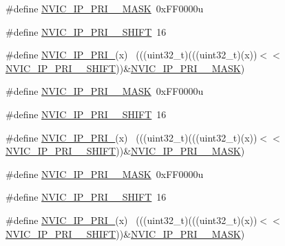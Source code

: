 \begin{DoxyCompactItemize}
\item 
\#define \hyperlink{group___n_v_i_c___register___masks_ga020ccac56651e055f659cbcc0387d0b2}{N\+V\+I\+C\+\_\+\+I\+P\+\_\+\+P\+R\+I\+\_\+\_\+\+M\+A\+SK}~0x\+F\+F0000u
\item 
\#define \hyperlink{group___n_v_i_c___register___masks_ga9ecbd3ab4a0623c8001df6917c2764b2}{N\+V\+I\+C\+\_\+\+I\+P\+\_\+\+P\+R\+I\+\_\+\_\+\+S\+H\+I\+FT}~16
\item 
\#define \hyperlink{group___n_v_i_c___register___masks_ga2ee87e9760b319a619478b44d48a0781}{N\+V\+I\+C\+\_\+\+I\+P\+\_\+\+P\+R\+I\+\_}(x)                                              ~(((uint32\+\_\+t)(((uint32\+\_\+t)(x))$<$$<$\hyperlink{group___n_v_i_c___register___masks_ga9ecbd3ab4a0623c8001df6917c2764b2}{N\+V\+I\+C\+\_\+\+I\+P\+\_\+\+P\+R\+I\+\_\+\_\+\+S\+H\+I\+FT}))\&\hyperlink{group___n_v_i_c___register___masks_ga020ccac56651e055f659cbcc0387d0b2}{N\+V\+I\+C\+\_\+\+I\+P\+\_\+\+P\+R\+I\+\_\+\_\+\+M\+A\+SK})
\item 
\#define \hyperlink{group___n_v_i_c___register___masks_gab53749f36c450457fd446a1711f69c13}{N\+V\+I\+C\+\_\+\+I\+P\+\_\+\+P\+R\+I\+\_\+\_\+\+M\+A\+SK}~0x\+F\+F0000u
\item 
\#define \hyperlink{group___n_v_i_c___register___masks_ga40e00b75ebe69a73a1ee9a41ef0c3d9b}{N\+V\+I\+C\+\_\+\+I\+P\+\_\+\+P\+R\+I\+\_\+\_\+\+S\+H\+I\+FT}~16
\item 
\#define \hyperlink{group___n_v_i_c___register___masks_ga550661c149fe417e7d4e2e488552bd59}{N\+V\+I\+C\+\_\+\+I\+P\+\_\+\+P\+R\+I\+\_}(x)                                            ~(((uint32\+\_\+t)(((uint32\+\_\+t)(x))$<$$<$\hyperlink{group___n_v_i_c___register___masks_ga40e00b75ebe69a73a1ee9a41ef0c3d9b}{N\+V\+I\+C\+\_\+\+I\+P\+\_\+\+P\+R\+I\+\_\+\_\+\+S\+H\+I\+FT}))\&\hyperlink{group___n_v_i_c___register___masks_gab53749f36c450457fd446a1711f69c13}{N\+V\+I\+C\+\_\+\+I\+P\+\_\+\+P\+R\+I\+\_\+\_\+\+M\+A\+SK})
\item 
\#define \hyperlink{group___n_v_i_c___register___masks_ga99c3d327033fb0d1f9bdbef784ebe3ed}{N\+V\+I\+C\+\_\+\+I\+P\+\_\+\+P\+R\+I\+\_\+\_\+\+M\+A\+SK}~0x\+F\+F0000u
\item 
\#define \hyperlink{group___n_v_i_c___register___masks_gaa24809c00c9d32beee7171f4a75221e8}{N\+V\+I\+C\+\_\+\+I\+P\+\_\+\+P\+R\+I\+\_\+\_\+\+S\+H\+I\+FT}~16
\item 
\#define \hyperlink{group___n_v_i_c___register___masks_gaf8701f5319b3a4dafebcc9b6a733e558}{N\+V\+I\+C\+\_\+\+I\+P\+\_\+\+P\+R\+I\+\_}(x)                                            ~(((uint32\+\_\+t)(((uint32\+\_\+t)(x))$<$$<$\hyperlink{group___n_v_i_c___register___masks_gaa24809c00c9d32beee7171f4a75221e8}{N\+V\+I\+C\+\_\+\+I\+P\+\_\+\+P\+R\+I\+\_\+\_\+\+S\+H\+I\+FT}))\&\hyperlink{group___n_v_i_c___register___masks_ga99c3d327033fb0d1f9bdbef784ebe3ed}{N\+V\+I\+C\+\_\+\+I\+P\+\_\+\+P\+R\+I\+\_\+\_\+\+M\+A\+SK})
$$
\end{DoxyCompactItemize}
